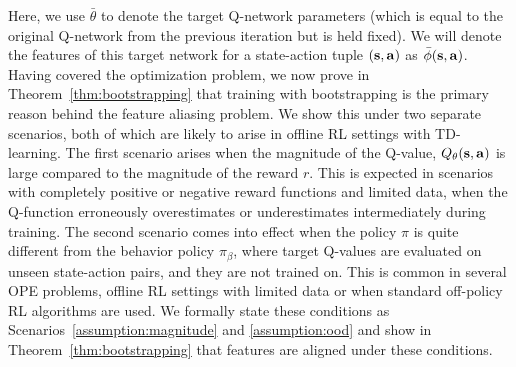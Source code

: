 Here, we  use $\bar{\theta}$ to denote the target Q-network parameters (which is equal to the original Q-network from the previous iteration but is held fixed). We will denote the features of this target network for a state-action tuple $(\mathbf{s}, \mathbf{a})$ as $\bar{\phi}(\mathbf{s}, \mathbf{a})$.
Having covered the optimization problem, we now prove in Theorem~\ref{thm:bootstrapping} that training with bootstrapping is the primary reason behind the feature aliasing problem. We show this under two separate scenarios, both of which are likely to arise in offline RL settings with TD-learning.
The first scenario arises when the magnitude of the Q-value, $Q_{\theta}(\mathbf{s}, \mathbf{a})$ is large compared to the magnitude of the reward $r$. This is expected in scenarios with completely positive or negative reward functions and limited data, when the Q-function erroneously overestimates or underestimates intermediately during training.
The second scenario comes into effect when the policy $\pi$ is quite different
from the behavior policy $\pi_\beta$, where target Q-values are evaluated on unseen state-action pairs, and they are not trained on.
This is common in several OPE problems, offline RL settings with limited data or when standard off-policy RL algorithms are used.
We formally state these conditions as Scenarios~\ref{assumption:magnitude} and \ref{assumption:ood} and show in Theorem~\ref{thm:bootstrapping} that features are aligned under these conditions.

